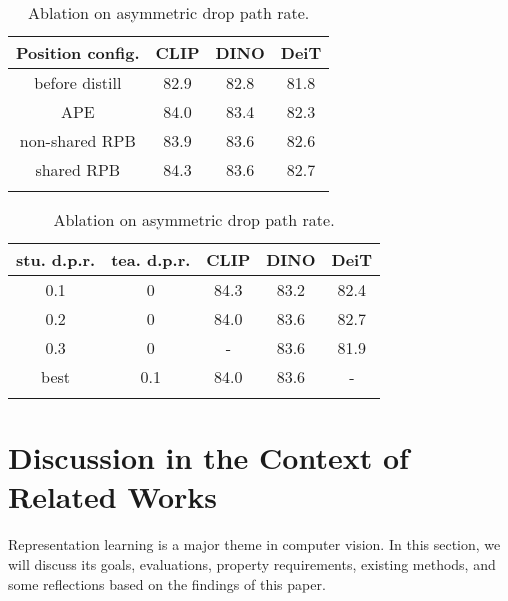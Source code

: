 \documentclass{article}
\begin{document}
\begin{table}[t]
\begin{minipage}{0.49\linewidth}
\end{minipage}\hfill
\begin{minipage}{0.49\linewidth}
    \centering
    

    \addtolength{\tabcolsep}{-1pt}
    \caption{Ablation on position encoding configurations.}
    \begin{tabular}{c|ccc}
        \Xhline{2\arrayrulewidth}
            Position config. & CLIP & DINO & DeiT \\
            \hline
            before distill & 82.9 & 82.8 & 81.8 \\
            \hline
            APE & 84.0 & 83.4 & 82.3  \\
            non-shared RPB & 83.9 & 83.6 & 82.6 \\
            shared RPB & 84.3 & 83.6 & 82.7 \\
            \Xhline{2\arrayrulewidth}
    \end{tabular}
    \label{tab:ablation_position}
    
    \vspace{1em}
    \addtolength{\tabcolsep}{-2pt}
    \caption{Ablation on asymmetric drop path rate.}
    \begin{tabular}{cc|ccc}
        \Xhline{2\arrayrulewidth}
            stu. d.p.r. & tea. d.p.r. & CLIP & DINO & DeiT \\
            \hline
            0.1 & 0 & 84.3 & 83.2 & 82.4 \\
            0.2 & 0 & 84.0 & 83.6 & 82.7 \\
            0.3 & 0 & - & 83.6 & 81.9 \\
            best & 0.1 & 84.0 & 83.6 & - \\
            \Xhline{2\arrayrulewidth}
    \end{tabular}
    \label{tab:ablation_dpr}
    
\end{minipage}
\end{table}

\section{Discussion in the Context of Related Works}

Representation learning is a major theme in computer vision. In this section, we will discuss its goals, evaluations, property requirements, existing methods, and some reflections based on the findings of this paper.
\end{document}
